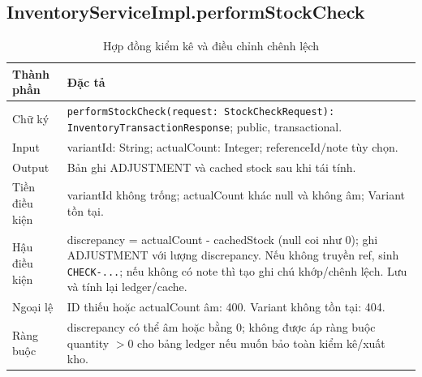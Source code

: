 \documentclass[12pt,a4paper,oneside]{report}
\begin{document}
\subsection{InventoryServiceImpl.performStockCheck}
\begin{table}[htbp]
\centering\small
\caption{Hợp đồng kiểm kê và điều chỉnh chênh lệch}
\begin{tabularx}{\textwidth}{@{}p{3.1cm}Y@{}}\toprule
Thành phần & Đặc tả\\\midrule
Chữ ký & \texttt{performStockCheck(request: StockCheckRequest): InventoryTransactionResponse}; public, transactional.\\
Input & variantId: String; actualCount: Integer; referenceId/note tùy chọn.\\
Output & Bản ghi ADJUSTMENT và cached stock sau khi tái tính.\\
Tiền điều kiện & variantId không trống; actualCount khác null và không âm; Variant tồn tại.\\
Hậu điều kiện & discrepancy = actualCount - cachedStock (null coi như 0); ghi ADJUSTMENT với lượng discrepancy. Nếu không truyền ref, sinh \texttt{CHECK-...}; nếu không có note thì tạo ghi chú khớp/chênh lệch. Lưu và tính lại ledger/cache.\\
Ngoại lệ & ID thiếu hoặc actualCount âm: 400. Variant không tồn tại: 404.\\
Ràng buộc & discrepancy có thể âm hoặc bằng 0; không được áp ràng buộc quantity $> 0$ cho bảng ledger nếu muốn bảo toàn kiểm kê/xuất kho.\\
\bottomrule\end{tabularx}
\end{table}
\end{document}
